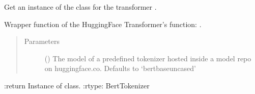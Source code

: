 \documentclass[letterpaper,10pt,english]{sphinxmanual}
\begin{document}

\begin{fulllineitems}
\label{\detokenize{code:code_utils.utils.get_bert_model}}
Get an instance of the class  for the transformer .

Wrapper function of the HuggingFace Transformer’s  function:
.
\begin{quote}\begin{description}
\item[{Parameters}] \leavevmode
{} (\sphinxstyleliteralemphasis{\sphinxupquote{, }}) \textendash{} The model  of a predefined tokenizer hosted inside a
model repo on huggingface.co. Defaults to ‘bert\sphinxhyphen{}base\sphinxhyphen{}uncased’

\end{description}\end{quote}

:return Instance of  class.
:rtype: BertTokenizer

\end{fulllineitems}

\end{document}
